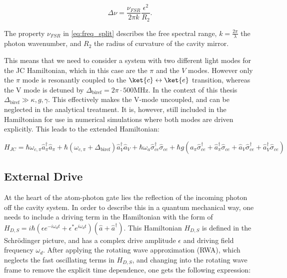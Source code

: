\begin{equation}
	\Delta\nu = \frac{\nu_{FSR}}{2\pi k}\frac{\epsilon^2}{R_2}.
	\label{eq:freq_split}
\end{equation}

The property $\nu_{FSR}$ in \eqref{eq:freq_split} describes the free spectral range, $k=\frac{2\pi}{\lambda}$ the photon wavenumber, and $R_2$ the radius of curvature of the cavity mirror.

This means that we need to consider a system with two different light modes for the JC Hamiltonian, which in this case are the $\pi$ and the $V$ modes. However only the $\pi$ mode is resonantly coupled to the $\ket{c}\leftrightarrow\ket{e}$ transition, whereas the V mode is detuned by $\Delta_{\text{biref}}=2\pi\cdot500\text{MHz}$. In the context of this thesis $\Delta_{\text{biref}} \gg \kappa,g,\gamma$. This effectively makes the V-mode uncoupled, and can be neglected in the analytical treatment. It is, however, still included in the Hamiltonian for use in numerical simulations where both modes are driven explicitly. This leads to the extended Hamiltonian:

\begin{equation}
	H_{JC} = \hbar\omega_{c,\pi}\hat{a}_\pi^\dag\hat{a}_\pi + \hbar(\omega_{c,\pi}+\Delta_{\text{biref}})\hat{a}_V^\dag\hat{a}_V + \hbar\omega_{a} \hat{\sigma}_{ce}^\dag\hat{\sigma}_{ce} + \hbar g(\hat{a}_\pi\hat{\sigma}_{ce}^\dag + \hat{a}_\pi^\dag\hat{\sigma}_{ce} + \hat{a}_V\hat{\sigma}_{ce}^\dag + \hat{a}_V^\dag\hat{\sigma}_{ce})
	\label{eq:jc_hamiltonian_w_birefringence}
\end{equation}

\subsection{External Drive}

At the heart of the atom-photon gate lies the reflection of the incoming photon off the cavity system. In order to describe this in a quantum mechanical way, one needs to include a driving term in the Hamiltonian with the form of $H_{D,S}=i\hbar(\epsilon e^{-i\omega_d t} + \epsilon^{*}e^{i\omega_d t})(\hat{a} + \hat{a}^\dagger)$. This Hamiltonian $H_{D,S}$ is defined in the Schrödinger picture, and has a complex drive amplitude $\epsilon$ and driving field frequency $\omega_d$. After applying the rotating wave approximation (RWA), which neglects the fast oscillating terms in $H_{D,S}$, and changing into the rotating wave frame to remove the explicit time dependence, one gets the following expression:

